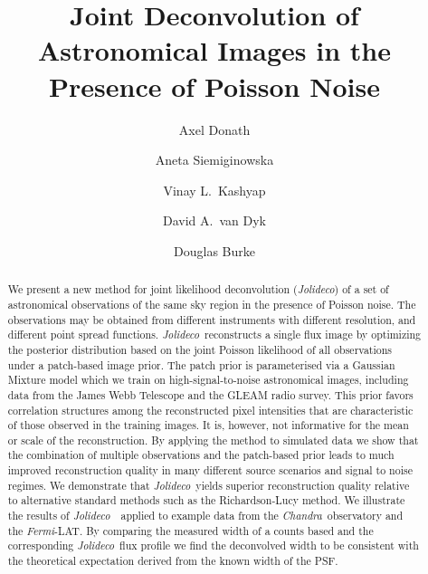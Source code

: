 \documentclass[twocolumn]{aastex631}
\newcommand{\chandra}{\textit{Chandra}~}
\newcommand{\ferminospace}{\textit{Fermi}-LAT}
\newcommand{\jolideco}{\textit{Jolideco}~}
\newcommand{\jolideconospace}{\textit{Jolideco}}
\begin{document}
    \title{Joint Deconvolution of Astronomical Images in the Presence of Poisson Noise}

    \author[0000-0003-4568-7005]{Axel Donath}
    \author[0000-0002-0905-7375]{Aneta Siemiginowska}
    \author[0000-0002-3869-7996]{Vinay L.\ Kashyap} 
    \author[0000-0002-0816-331X]{David A.\ van Dyk}
    \author[0000-0003-4428-7835]{Douglas Burke}



    \begin{abstract}
    
        We present a new method for joint likelihood deconvolution (\jolideconospace) of a set of astronomical observations of the same sky region in the presence of Poisson noise. 
        The observations may be obtained from different instruments with  different resolution, and different point spread functions. \jolideco reconstructs a single flux image by optimizing the posterior distribution based on the joint Poisson likelihood of all observations under a patch-based image prior. The patch prior is parameterised via a Gaussian Mixture model which we train on high-signal-to-noise astronomical images, including data from the  James Webb Telescope and the GLEAM radio survey. This prior favors correlation structures among the reconstructed pixel intensities that are characteristic of those observed in the %
        training images. 
        It is, however, not informative for the mean or scale of the reconstruction. By applying the method to simulated data we show that the combination of multiple observations and the patch-based prior leads to much improved reconstruction quality in many different source scenarios and signal to noise regimes. We demonstrate that \jolideco yields superior reconstruction quality relative to alternative standard methods such as the Richardson-Lucy method. We illustrate the results of \jolideco\ applied to example data from the \chandra observatory and the \ferminospace. By comparing the measured width of a counts based and the corresponding \jolideco flux profile we find the deconvolved width to be consistent with the theoretical expectation derived from the known width of the PSF.
    \end{abstract}
\end{document}
